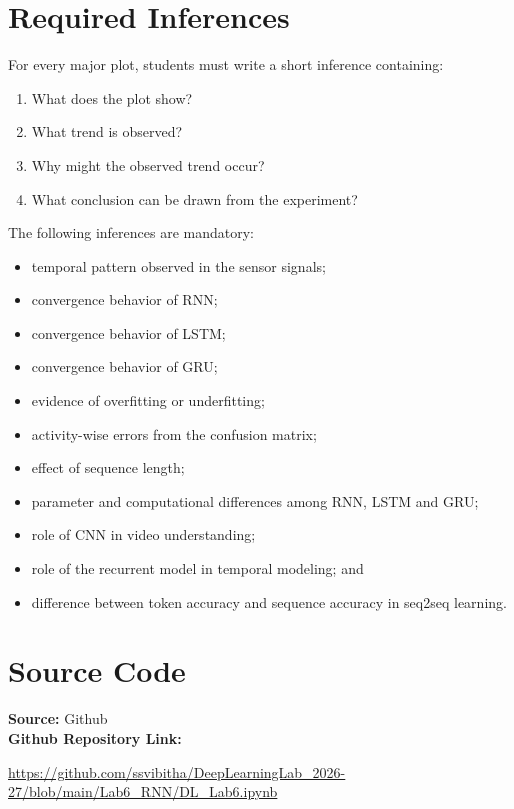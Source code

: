 \documentclass[10pt]{article}
\begin{document}
\section{Required Inferences}

For every major plot, students must write a short inference containing:

\begin{enumerate}
\item What does the plot show?
\item What trend is observed?
\item Why might the observed trend occur?
\item What conclusion can be drawn from the experiment?
\end{enumerate}

The following inferences are mandatory:

\begin{itemize}
\item temporal pattern observed in the sensor signals;
\item convergence behavior of RNN;
\item convergence behavior of LSTM;
\item convergence behavior of GRU;
\item evidence of overfitting or underfitting;
\item activity-wise errors from the confusion matrix;
\item effect of sequence length;
\item parameter and computational differences among RNN, LSTM and GRU;
\item role of CNN in video understanding;
\item role of the recurrent model in temporal modeling; and
\item difference between token accuracy and sequence accuracy in seq2seq learning.
\end{itemize}

\section{Source Code}

\noindent\textbf{Source:} Github\\
\noindent\textbf{Github Repository Link:}

\url{https://github.com/ssvibitha/DeepLearningLab_2026-27/blob/main/Lab6_RNN/DL_Lab6.ipynb}
\end{document}
